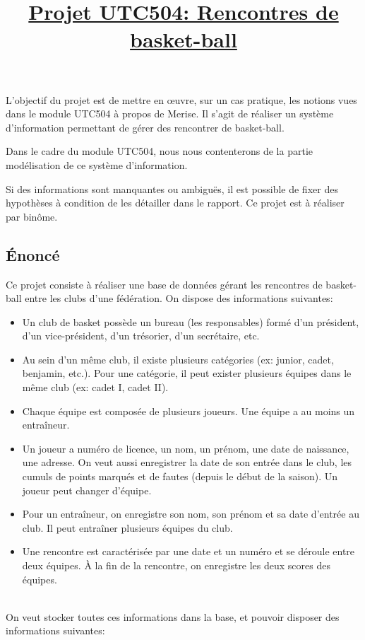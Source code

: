 \documentclass[a4,12pt]{article}
\title{\underline{Projet UTC504: Rencontres de basket-ball}}
\author{}
\date{}
\begin{document}
\maketitle

L'objectif du projet est de mettre en {\oe}uvre, sur un cas pratique, les
notions vues dans le module UTC504 à propos de Merise. Il s'agit de réaliser un
système d'information permettant de gérer des rencontrer de basket-ball.

Dans le cadre du module UTC504, nous nous contenterons de la partie modélisation
de ce système d'information.

Si des informations sont manquantes ou ambiguës, il est possible de fixer des
hypothèses à condition de les détailler dans le rapport. Ce projet est à
réaliser par binôme.

\subsection*{Énoncé}
Ce projet consiste à réaliser une base de données gérant les rencontres de
basket-ball entre les clubs d'une fédération. On dispose des informations
suivantes:
\begin{itemize}
  \item Un club de basket possède un bureau (les responsables) formé d'un
    président, d'un vice-président, d'un trésorier, d'un secrétaire, etc.
  \item Au sein d'un même club, il existe plusieurs catégories (ex: junior,
    cadet, benjamin, etc.). Pour une catégorie, il peut exister plusieurs
    équipes dans le même club (ex: cadet I, cadet II).
  \item Chaque équipe est composée de plusieurs joueurs. Une équipe a au moins
    un entraîneur.
  \item Un joueur a numéro de licence, un nom, un prénom, une date de naissance,
    une adresse. On veut aussi enregistrer la date de son entrée dans le club,
    les cumuls de points marqués et de fautes (depuis le début de la saison). Un
    joueur peut changer d'équipe.
  \item Pour un entraîneur, on enregistre son nom, son prénom et sa date
    d'entrée au club. Il peut entraîner plusieurs équipes du club.
  \item Une rencontre est caractérisée par une date et un numéro et se déroule
    entre deux équipes. À la fin de la rencontre, on enregistre les deux scores
    des équipes.
\end{itemize}
\ \\On veut stocker toutes ces informations dans la base, et pouvoir disposer des
informations suivantes:
\end{document}

